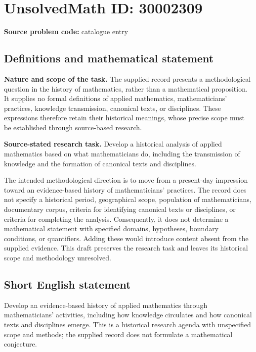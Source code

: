 \documentclass[11pt]{article}
\begin{document}
\section*{UnsolvedMath ID: 30002309}
\textbf{Source problem code:} catalogue entry
\subsection{Definitions and mathematical statement}
\textbf{Nature and scope of the task.} The supplied record presents a methodological question in the history of mathematics, rather than a mathematical proposition. It supplies no formal definitions of applied mathematics, mathematicians' practices, knowledge transmission, canonical texts, or disciplines. These expressions therefore retain their historical meanings, whose precise scope must be established through source-based research.

\textbf{Source-stated research task.} Develop a historical analysis of applied mathematics based on what mathematicians do, including the transmission of knowledge and the formation of canonical texts and disciplines.

The intended methodological direction is to move from a present-day impression toward an evidence-based history of mathematicians' practices. The record does not specify a historical period, geographical scope, population of mathematicians, documentary corpus, criteria for identifying canonical texts or disciplines, or criteria for completing the analysis. Consequently, it does not determine a mathematical statement with specified domains, hypotheses, boundary conditions, or quantifiers. Adding these would introduce content absent from the supplied evidence. This draft preserves the research task and leaves its historical scope and methodology unresolved.
\subsection{Short English statement}
Develop an evidence-based history of applied mathematics through mathematicians' activities, including how knowledge circulates and how canonical texts and disciplines emerge. This is a historical research agenda with unspecified scope and methods; the supplied record does not formulate a mathematical conjecture.
\end{document}
